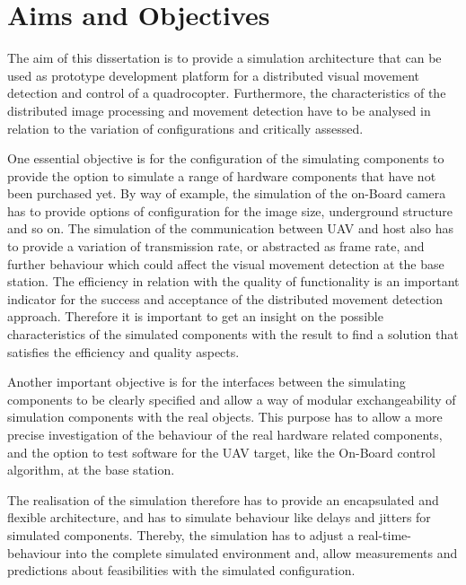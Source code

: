 \section{Aims and Objectives}

The aim of this dissertation is to provide a simulation architecture that can be
used as prototype development platform for a distributed visual movement
detection and control of a quadrocopter. Furthermore, the characteristics of the
distributed image processing and movement detection have to be analysed in
relation to the variation of configurations and critically assessed.

One essential objective is for the configuration of the simulating components
to provide the option to simulate a range of hardware components that have not been
purchased yet. By way of example, the simulation of the on-Board camera has
to provide options of configuration for the image size, underground structure and
so on. The simulation of the communication between \gls{UAV} and host also has to
provide a variation of transmission rate, or abstracted as frame rate, and further behaviour which could affect
the visual movement detection at the base station. The efficiency in relation
with the quality of functionality is an important indicator for the success and acceptance of
the distributed movement detection approach. 
\newpage
Therefore it is important to get an insight
on the possible characteristics of the simulated components with the result to
find a solution that satisfies the efficiency and quality aspects.

Another important objective is for the interfaces between the simulating
components to be clearly specified and allow a way of modular exchangeability of
simulation components with the real objects.
This purpose has to allow a more precise investigation of the behaviour of the real hardware related components, and the option to test software for the \gls{UAV} target, like the On-Board control
algorithm, at the base station.

The realisation of the simulation therefore has to provide an encapsulated and
flexible architecture, and has to simulate behaviour like delays and jitters for
simulated components. Thereby, the simulation has to adjust a real-time-behaviour
into the complete simulated environment and, allow measurements and predictions 
about feasibilities with the simulated configuration.
